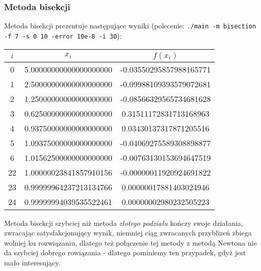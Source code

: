 \documentclass[a4paper,11pt]{article}
\begin{document}
    \subsubsection{Metoda bisekcji}
    Metoda bisekcji prezentuje następujące wyniki (polecenie: \texttt{./main -m bisection -f 7 -s 0 10 -error 10e-8 -i 30}):
     \begin{center}
      \begin{tabular}{S[table-format=1.0]S[table-format=-1.9]S[table-format=-1.15,table-auto-round=false]}
        \toprule
        {$i$}                & {$x_i$}               & {$f(x_i)$}            \\  & 5.00000000000000000000 & -0.03550295857988165771 \\
          1 & 2.50000000000000000000 & -0.09988109393579072681 \\
          2 & 1.25000000000000000000 & -0.08566329565734681628 \\
          3 & 0.62500000000000000000 & 0.31511172831713168963 \\
          4 & 0.93750000000000000000 & 0.03430137317871205516 \\
          5 & 1.09375000000000000000 & -0.04069275589308898877 \\
          6 & 1.01562500000000000000 & -0.00763130153694647519 \\
          22 & 1.00000023841857910156 & -0.00000011920924691822 \\
          23 & 0.99999964237213134766 & 0.00000017881403024946 \\
          24 & 0.99999994039535522461 & 0.00000002980232505223 \\ \bottomrule
        \end{tabular}
    \end{center}
    Metoda bisekcji szybciej niż metoda \emph{złotego podziału} kończy swoje działania, zwracając satysfakcjonujący wynik, niemniej ciąg zwracanych przyblizeń zbiega wolniej ku rozwiązaniu, dlatego też połączenie tej metody z metodą Newtona nie da szybciej dobrego rowiązania - dlatego pominiemy ten przypadek, gdyż jest mało interesujący.
    
\end{document}
